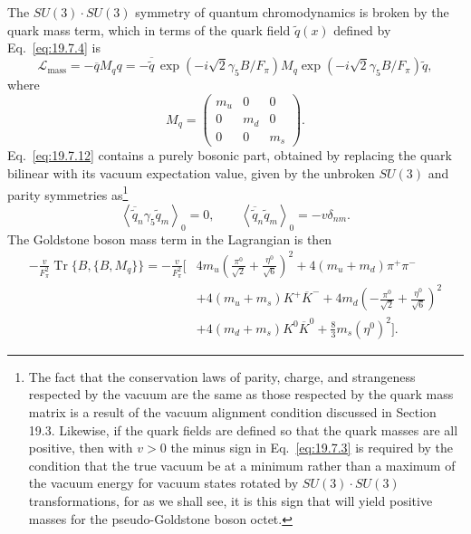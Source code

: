 The $SU(3)\cdot SU(3)$ symmetry of quantum chromodynamics is broken by the quark mass term, which in terms of the quark field $\widetilde q(x)$ defined by Eq.~\eqref{eq:19.7.4} is
\begin{equation}
\mathcal L_{\text{mass}}
=-\overline q M_q q
=-\overline{\widetilde q}\,
\exp\left(-i\sqrt2\gamma_5B/F_\pi\right)
M_q
\exp\left(-i\sqrt2\gamma_5B/F_\pi\right)
\widetilde q,
\tag{19.7.12}\label{eq:19.7.12}
\end{equation}
where
\begin{equation}
M_q=
\begin{pmatrix}
m_u&0&0\\
0&m_d&0\\
0&0&m_s
\end{pmatrix}.
\tag{19.7.13}\label{eq:19.7.13}
\end{equation}
Eq.~\eqref{eq:19.7.12} contains a purely bosonic part, obtained by replacing the quark bilinear with its vacuum expectation value, given by the unbroken $SU(3)$ and parity symmetries as\footnote{The fact that the conservation laws of parity, charge, and strangeness respected by the vacuum are the same as those respected by the quark mass matrix is a result of the vacuum alignment condition discussed in Section 19.3. Likewise, if the quark fields are defined so that the quark masses are all positive, then with $v>0$ the minus sign in Eq.~\eqref{eq:19.7.3} is required by the condition that the true vacuum be at a minimum rather than a maximum of the vacuum energy for vacuum states rotated by $SU(3)\cdot SU(3)$ transformations, for as we shall see, it is this sign that will yield positive masses for the pseudo-Goldstone boson octet.}
\begin{equation}
\left\langle\overline{\widetilde q}_n\gamma_5\widetilde q_m\right\rangle_0=0,
\qquad
\left\langle\overline{\widetilde q}_n\widetilde q_m\right\rangle_0
=-v\delta_{nm}.
\tag{19.7.14}\label{eq:19.7.14}
\end{equation}
The Goldstone boson mass term in the Lagrangian is then
\begin{equation}
\begin{split}
-\frac{v}{F_\pi^2}\operatorname{Tr}\{B,\{B,M_q\}\}
=-\frac{v}{F_\pi^2}\bigg[
&4m_u\left(\frac{\pi^0}{\sqrt2}+\frac{\eta^0}{\sqrt6}\right)^2
+4(m_u+m_d)\pi^+\pi^-
\\
&+4(m_u+m_s)K^+\overline K^-
+4m_d\left(-\frac{\pi^0}{\sqrt2}+\frac{\eta^0}{\sqrt6}\right)^2
\\
&+4(m_d+m_s)K^0\overline K^0
+\frac83m_s(\eta^0)^2
\bigg].
\end{split}
\tag{19.7.15}\label{eq:19.7.15}
\end{equation}
